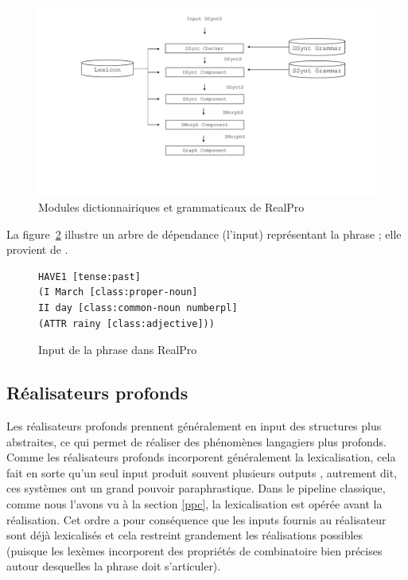 \begin{figure}[htb]
	\centering
	\includegraphics[width=1\textwidth, trim = {0cm 4cm 0cm 0cm},clip]{ch2/figs/realpro.pdf}
	\caption{Modules dictionnairiques et grammaticaux de RealPro}
	\label{fig:RealPro}
\end{figure}

La figure~\ref{lst:realpro} illustre un arbre de dépendance (l'input) représentant la phrase ; elle provient de \cite{ReiterBuildingNaturalLanguage2000}.

\begin{figure}[htb]
\begin{lstlisting}[language=mate]
HAVE1 [tense:past]
(I March [class:proper-noun]
II day [class:common-noun numberpl]
(ATTR rainy [class:adjective]))
\end{lstlisting}
\caption{Input de la phrase  dans RealPro}
\label{lst:realpro}
\end{figure}


\subsection{Réalisateurs profonds}

Les réalisateurs profonds prennent généralement en input des structures plus abstraites, ce qui permet de réaliser des phénomènes langagiers plus profonds. Comme les réalisateurs profonds incorporent généralement la lexicalisation, cela fait en sorte qu'un seul input produit souvent plusieurs outputs \citep{PolguerePourmodelestratifie1998}, autrement dit, ces systèmes ont un grand pouvoir paraphrastique. Dans le pipeline classique, comme nous l'avons vu à la section \ref{ppc}, la lexicalisation est opérée avant la réalisation. Cet ordre a pour conséquence que les inputs fournis au réalisateur sont déjà lexicalisés et cela restreint grandement les réalisations possibles (puisque les lexèmes incorporent des propriétés de combinatoire bien précises autour desquelles la phrase doit s'articuler). 


